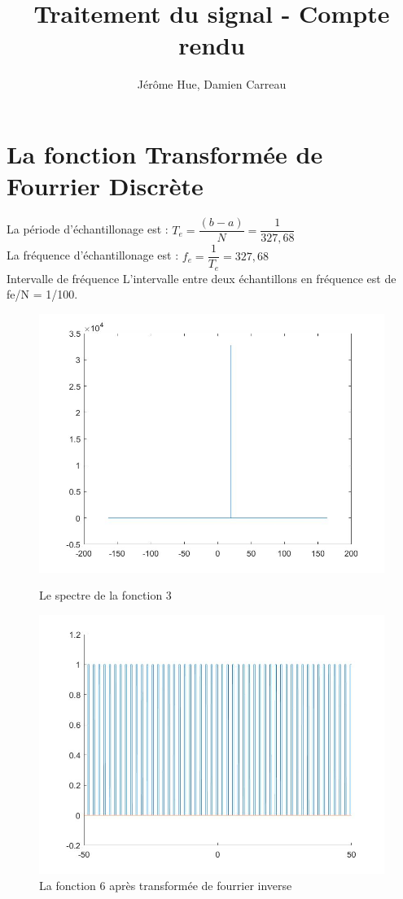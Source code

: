 \documentclass[10pt,a4paper]{article}
\author{Jérôme Hue, Damien Carreau}
\title{Traitement du signal - Compte rendu}
\begin{document}
\maketitle
\section{La fonction Transformée de Fourrier Discrète}
La période d'échantillonage est : \( T_e = \dfrac{(b-a)}{N} = \dfrac{1}{327,68} \) \\
La fréquence d'échantillonage est : \( f_e = \dfrac{1}{T_e} = 327,68 \) \\
Intervalle de fréquence
L'intervalle entre deux échantillons en fréquence est de fe/N = 1/100.


\begin{figure}
\includegraphics[scale=0.4]{tf_fct3.jpg}
\caption{Le spectre de la fonction 3}
\includegraphics[scale=0.4]{fct6.jpg}
\caption{La fonction 6 après transformée de fourrier inverse}
\end{figure}
\end{document}
